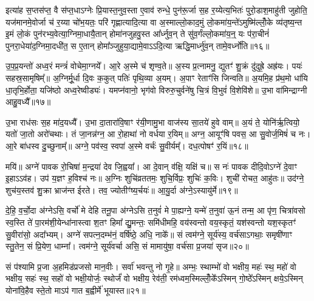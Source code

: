 इत्या॑ह स॒प्तस॑प्त॒ वै स॑प्त॒धा\-ऽग्नेः प्रि॒यास्त॒नुव॒स्ता ए॒वाव॑ रुन्धे॒ पुन॑रू॒र्जा स॒ह र॒य्येत्य॒भितः॑ पुरो॒डाश॒माहु॑ती जुहोति॒ यज॑मानमे॒वोर्जा च॑ र॒य्या चो॑भ॒यतः॒ परि॑ गृह्णात्यादि॒त्या वा अ॒स्माल्लो॒काद॒मुं लो॒कमा॑य॒न्ते॑\-ऽमुष्मि॑ल्लोँ॒के व्य॑तृष्य॒न्त इ॒मं लो॒कं पुन॑रभ्य॒वेत्या॒ग्निमा॒धायै॒तान् होमा॑नजुहवु॒स्त आ᳚र्ध्नुव॒न् ते सु॑व॒र्गंल्लो॒कमा॑य॒न्॒ यः प॑रा॒चीनं॑ पुनरा॒धेया॑द॒ग्निमा॒दधी॑त॒ स ए॒तान् होमा᳚ञ्जुहुया॒द्यामे॒वा\-ऽ\-ऽदि॒त्या ऋद्धि॒मार्ध्नु॑व॒न् तामे॒वर्ध्नो॑ति॥१६॥

{\anuvakamend[{ए॒तमे॒व जि॒ह्वा ए॒तान् पञ्च॑विꣳशतिश्च॥४॥}]}

उ॒प॒प्र॒यन्तो॑ अध्व॒रं मन्त्रं॑ वोचेमा॒ग्नये᳚। आ॒रे अ॒स्मे च॑ शृण्व॒ते॥ अ॒स्य प्र॒त्नामनु॒ द्युतꣳ॑ शु॒क्रं दु॑दुह्रे॒ अह्र॑यः। पयः॑ सहस्र॒सामृषिम्᳚॥ अ॒ग्निर्मू॒र्धा दि॒वः क॒कुत् पतिः॑ पृथि॒व्या अ॒यम्। अ॒पाꣳ रेताꣳ॑सि जिन्वति॥ अ॒यमि॒ह प्र॑थ॒मो धा॑यि धा॒तृभि॒र्\mbox{}होता॒ यजि॑ष्ठो अध्व॒रेष्वीड्यः॑। यमप्न॑वानो॒ भृग॑वो विरुरु॒चुर्वने॑षु चि॒त्रं वि॒भुवं॑ वि॒शेवि॑शे॥ उ॒भा वा॑मिन्द्राग्नी आहु॒वध्यै᳚॥१७॥

उ॒भा राध॑सः स॒ह मा॑द॒यध्यै᳚। उ॒भा दा॒तारा॑वि॒षाꣳ र॑यी॒णामु॒भा वाज॑स्य सा॒तये॑ हुवे वाम्॥ अ॒यं ते॒ योनि॑र्\mbox{}ऋ॒त्वियो॒ यतो॑ जा॒तो अरो॑चथाः। तं जा॒नन्न॑ग्न॒ आ रो॒हाथा॑ नो वर्धया र॒यिम्॥ अग्न॒ आयूꣳ॑षि पवस॒ आ सु॒वोर्ज॒मिषं॑ च नः। आ॒रे बा॑धस्व दु॒च्छुनाम्᳚॥ अग्ने॒ पव॑स्व॒ स्वपा॑ अ॒स्मे वर्चः॑ सु॒वीर्यम्᳚। दध॒त्पोषꣳ॑ र॒यिं॥१८॥

मयि॑॥ अग्ने॑ पावक रो॒चिषा॑ म॒न्द्रया॑ देव जि॒ह्वया᳚। आ दे॒वान् व॑क्षि॒ यक्षि॑ च॥ स नः॑ पावक दीदि॒वो\-ऽग्ने॑ दे॒वाꣳ इ॒हा\-ऽ\-ऽव॑ह। उप॑ य॒ज्ञꣳ ह॒विश्च॑ नः॥ अ॒ग्निः शुचि॑व्रततमः॒ शुचि॒र्विप्रः॒ शुचिः॑ क॒विः। शुची॑ रोचत॒ आहु॑तः॥ उद॑ग्ने॒ शुच॑य॒स्तव॑ शु॒क्रा भ्राज॑न्त ईरते। तव॒ ज्योतीꣳ॑ष्य॒र्चयः॑॥ आ॒यु॒र्दा अ॑ग्ने॒\-ऽस्यायु॑र्मे॥१९॥

दे॒हि॒ व॒र्चो॒दा अ॑ग्ने\-ऽसि॒ वर्चो॑ मे देहि तनू॒पा अ॑ग्ने\-ऽसि त॒नुवं॑ मे पा॒ह्यग्ने॒ यन्मे॑ त॒नुवा॑ ऊ॒नं तन्म॒ आ पृ॑ण॒ चित्रा॑वसो स्व॒स्ति ते॑ पा॒रम॑शी॒येन्धा॑नास्त्वा श॒तꣳ हिमा᳚ द्यु॒मन्तः॒ समि॑धीमहि॒ वय॑स्वन्तो वय॒स्कृतं॒ यश॑स्वन्तो यश॒स्कृतꣳ॑ सु॒वीरा॑सो॒ अदा᳚भ्यम्। अग्ने॑ सपत्न॒दम्भ॑नं॒ वर्\mbox{}षि॑ष्ठे॒ अधि॒ नाके᳚॥ सं त्वम॑ग्ने॒ सूर्य॑स्य॒ वर्च॑सा\-ऽगथाः॒ समृषी॑णाꣳ स्तु॒तेन॒ सं प्रि॒येण॒ धाम्ना᳚। त्वम॑ग्ने॒ सूर्य॑वर्चा असि॒ सं मामायु॑षा॒ वर्च॑सा प्र॒जया॑ सृज॥२०॥

{\anuvakamend[{आ॒हु॒वध्यै॑ र॒यिं मे॒ वर्च॑सा स॒प्तद॑श च॥५॥}]}

सं प॑श्यामि प्र॒जा अ॒हमिड॑प्रजसो मान॒वीः। सर्वा॑ भवन्तु नो गृ॒हे॥ अम्भः॒ स्थाम्भो॑ वो भक्षीय॒ महः॑ स्थ॒ महो॑ वो भक्षीय॒ सहः॑ स्थ॒ सहो॑ वो भक्षी॒योर्जः॒ स्थोर्जं॑ वो भक्षीय॒ रेव॑ती॒ रम॑ध्वम॒स्मिल्लोँ॒के᳚\-ऽस्मिन् गो॒ष्ठे᳚\-ऽस्मिन् क्षये॒\-ऽस्मिन् योना॑वि॒हैव स्ते॒तो मा\-ऽप॑ गात ब॒ह्वीर्मे॑ भूयास्त॥२१॥

